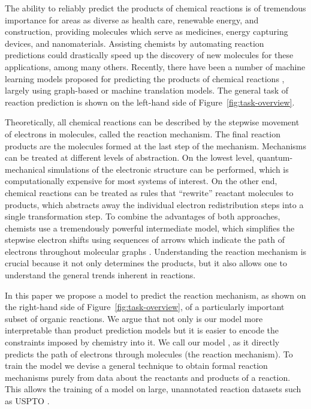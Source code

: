 
The ability to reliably predict the products of chemical reactions is of tremendous importance for areas as diverse as health care, renewable energy, and construction, providing molecules which serve as medicines, energy capturing devices, and nanomaterials. 
Assisting chemists by automating reaction predictions could drastically speed up the discovery of new molecules for these applications, among many others. Recently, there have been a number of machine learning models proposed for predicting the products of chemical reactions \cite{coley2017prediction,jin2017predicting,schwaller2017found,neural-symbolic,segler2018planning,wei2016neural}, largely using graph-based or machine translation models. The general task of reaction prediction is shown on the left-hand side of Figure~\ref{fig:task-overview}.

Theoretically, all chemical reactions can be described by the stepwise movement of electrons in molecules, called the reaction mechanism. The final reaction products are the molecules formed at the last step of the mechanism. 
Mechanisms can be treated at different levels of abstraction. On the lowest level, quantum-mechanical simulations of the electronic structure can be performed, which is computationally expensive for most systems of interest. 
On the other end, chemical reactions can be treated as rules that ``rewrite'' reactant molecules to products, which abstracts away the individual electron redistribution steps into a single transformation step. 
To combine the advantages of both approaches, chemists use a tremendously powerful intermediate model, which simplifies the stepwise electron shifts using sequences of arrows which indicate the path of electrons throughout molecular graphs \cite{herges1994organizing}. 
Understanding the reaction mechanism is crucial because it not only determines the products, but it also allows one to understand the general trends inherent in reactions. %


In this paper we propose a model to predict the reaction mechanism, as shown on the right-hand side of Figure~\ref{fig:task-overview}, of a particularly important subset of organic reactions.
We argue that not only is our model more interpretable than product prediction models but it is easier to encode the constraints imposed by chemistry into it. 
We call our model \ourModel, as it directly predicts the path of electrons through molecules (the reaction mechanism). To train the model we devise a general technique to obtain formal reaction mechanisms purely from data about the reactants and products of a reaction. This allows  the training of a model on large, unannotated reaction datasets such as USPTO \cite{lowe2012extraction}. 



